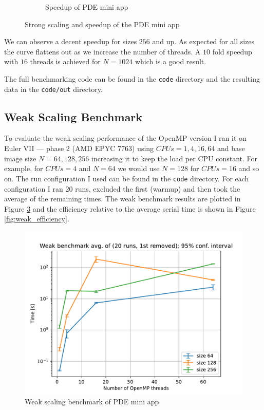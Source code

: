 \documentclass[unicode,11pt,a4paper,oneside,numbers=endperiod,openany]{scrartcl}
\begin{document}
\begin{figure}[h!t]
\begin{subfigure}{.5\textwidth}
        \caption{Speedup of PDE mini app}
        \label{fig:strong_speedup}
    \end{subfigure}
    \caption{Strong scaling and speedup of the PDE mini app}
\end{figure}

We can observe a decent speedup for sizes $256$ and up. As expected for all sizes the curve flattens out as we increase the number of threads. A $10$ fold speedup with $16$ threads is achieved for $N=1024$ which is a good result.

The full benchmarking code can be found in the \texttt{code} directory and the resulting data in the \texttt{code/out} directory.

\subsection{Weak Scaling Benchmark}

To evaluate the weak scaling performance of the OpenMP version I ran it on Euler VII — phase 2 (AMD EPYC 7763) using $CPUs=1, 4, 16, 64$ and base image size $N=64, 128, 256$ increasing it to keep the load per CPU constant. For example, for $CPUs=4$ and $N=64$ we would use $N=128$ for $CPUs=16$ and so on.
The run configuration I used can be found in the \texttt{code} directory. For each configuration I ran 20 runs, excluded the first (warmup) and then took the average of the remaining times. The weak benchmark results are plotted in Figure \ref{fig:weak_scaling} and the efficiency relative to the average serial time is shown in Figure \ref{fig:weak_efficiency}.

\begin{figure}[h!t]
    \includegraphics[width=\textwidth]{plots/weak_scaling.pdf}
    \caption{Weak scaling benchmark of PDE mini app}
    \label{fig:weak_scaling}
\end{figure}
\end{document}
